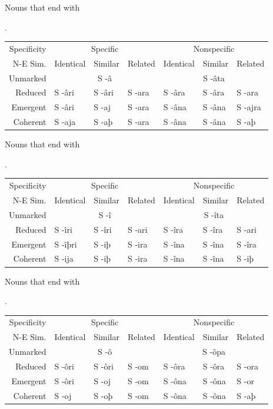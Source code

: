 \documentclass{book}
\begin{document}
\begin{tablenf}
  \caption{Nouns that end with }.
  \centering
  \begin{tabular}{r|lll|lll}
    Specificity & \multicolumn{3}{c|}{Specific} & \multicolumn{3}{c}{Nonspecific} \\
    N-E \bs{} Sim. & Identical & Similar & Related & Identical & Similar & Related \\
    \hline
    Unmarked & \multicolumn{3}{c|}{S -â} & \multicolumn{3}{c}{S -âta} \\
    Reduced & S -âri & S -âri & S -ara & S -âra & S -âra & S -ara \\
    Emergent & S -âri & S -aj & S -ara & S -âna & S -âna & S -ajra \\
    Coherent & S -aja & S -aþ & S -ara & S -âna & S -âna & S -aþ \\
  \end{tabular}
\end{tablenf}

\begin{tablenf}
  \caption{Nouns that end with }.
  \centering
  \begin{tabular}{r|lll|lll}
    Specificity & \multicolumn{3}{c|}{Specific} & \multicolumn{3}{c}{Nonspecific} \\
    N-E \bs{} Sim. & Identical & Similar & Related & Identical & Similar & Related \\
    \hline
    Unmarked & \multicolumn{3}{c|}{S -î} & \multicolumn{3}{c}{S -îta} \\
    Reduced & S -îri & S -îri & S -ari & S -îra & S -îra & S -ari \\
    Emergent & S -îþri & S -iþ & S -ira & S -îna & S -îna & S -îra \\
    Coherent & S -ija & S -iþ & S -ira & S -îna & S -îna & S -iþ \\
  \end{tabular}
\end{tablenf}

\begin{tablenf}
  \caption{Nouns that end with }.
  \centering
  \begin{tabular}{r|lll|lll}
    Specificity & \multicolumn{3}{c|}{Specific} & \multicolumn{3}{c}{Nonspecific} \\
    N-E \bs{} Sim. & Identical & Similar & Related & Identical & Similar & Related \\
    \hline
    Unmarked & \multicolumn{3}{c|}{S -ô} & \multicolumn{3}{c}{S -ôpa} \\
    Reduced & S -ôri & S -ôri & S -om & S -ôra & S -ôra & S -ora \\
    Emergent & S -ôri & S -oj & S -om & S -ôna & S -ôna & S -or \\
    Coherent & S -oj & S -oþ & S -om & S -ôna & S -ôna & S -aþ \\
  \end{tabular}
\end{tablenf}
\end{document}
